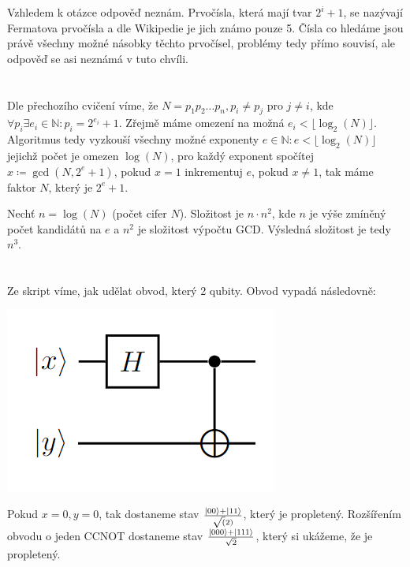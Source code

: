 \documentclass[12pt, a4paper]{article}
\begin{document}
Vzhledem k otázce  odpověď neznám. Prvočísla, která mají tvar $2^i + 1$, se nazývají Fermatova prvočísla a dle Wikipedie je jich známo pouze 5. Čísla co hledáme jsou právě všechny možné násobky těchto prvočísel, problémy tedy přímo souvisí, ale odpověď se asi neznámá v tuto chvíli.

\section{}
Dle přechozího cvičení víme, že $N = p_1p_2\dots p_n, p_i\neq p_j$ pro $j\neq i$, kde $\forall p_i \exists e_i \in \mathbb{N}: p_i = 2^{e_i}+1$. Zřejmě máme omezení na možná $e_i < \lfloor \log_2(N) \rfloor$. Algoritmus tedy vyzkouší všechny možné exponenty $e \in \mathbb{N}: e < \lfloor \log_2(N) \rfloor$  jejichž počet je omezen $\log(N)$, pro každý exponent spočítej $x \coloneqq \gcd(N,2^e+1)$, pokud $x=1$ inkrementuj $e$, pokud $x \neq 1$, tak máme faktor $N$, který je $2^e+1$.

Nechť $n = \log(N)$ (počet cifer $N$). Složitost je $n \cdot n^2$, kde $n$ je výše zmíněný počet kandidátů na $e$ a $n^2$ je složitost výpočtu GCD. Výsledná složitost je tedy $n^3$.

\section{}
Ze skript víme, jak udělat obvod, který  2 qubity. Obvod vypadá následovně:
\begin{center}
\includegraphics{7/hint.png}
\end{center}
Pokud $x = 0, y = 0$, tak dostaneme stav $\frac{\ket{00} + \ket{11}}{\sqrt(2)}$, který je propletený. Rozšířením obvodu o jeden CCNOT dostaneme stav $\frac{\ket{000}+\ket{111}}{\sqrt{2}}$, který si ukážeme, že je propletený.
\end{document}
